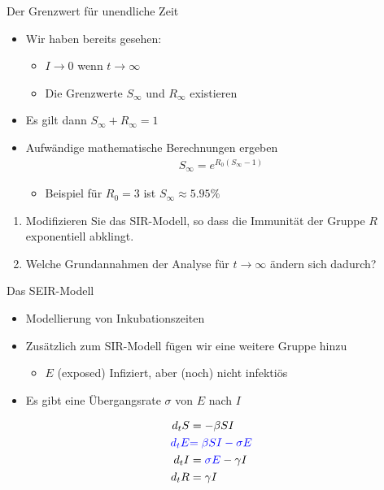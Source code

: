 \begin{frame}{Der Grenzwert für unendliche Zeit}
  \begin{itemize}
  \item Wir haben bereits gesehen:
    \begin{itemize}
    \item $I\to 0$ wenn $t\to \infty$
    \item Die Grenzwerte $S_\infty$ und $R_\infty$ existieren 
    \end{itemize}
  \item Es gilt dann $S_\infty+R_\infty = 1$
  \item Aufwändige mathematische Berechnungen ergeben
    \begin{gather*}
      S_\infty = e^{R_0(S_\infty-1)}
    \end{gather*}
    \begin{itemize}
    \item Beispiel für $R_0=3$ ist $S_\infty \approx 5.95\%$
    \end{itemize}
  \end{itemize}
\end{frame}

\begin{Aufgabe}
  \begin{enumerate}
  \item Modifizieren Sie das SIR-Modell, so dass die Immunität der Gruppe
  $R$ exponentiell abklingt.
  \item Welche Grundannahmen der Analyse für $t\to\infty$ ändern sich dadurch?
  \end{enumerate}
\end{Aufgabe}

\begin{frame}{Das SEIR-Modell}
  \begin{itemize}
  \item Modellierung von Inkubationszeiten
  \item Zusätzlich zum SIR-Modell fügen wir eine weitere Gruppe hinzu
    \begin{itemize}
    \item $E$ (exposed) Infiziert, aber (noch) nicht infektiös
    \end{itemize}
  \item Es gibt eine Übergangsrate $\sigma$ von $E$ nach $I$
  \end{itemize}
  \begin{align*}
    d_t S &=-\beta SI\\
    {\color{blue}d_t E} &{\color{blue}=\beta SI - \sigma E}\\
    d_t I &={\color{blue}\sigma E} - \gamma I\\
    d_t R &=\gamma I
  \end{align*}  
\end{frame}

